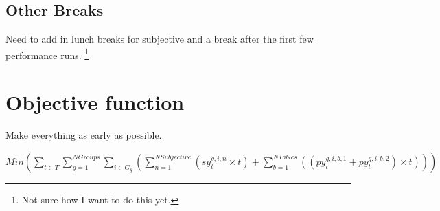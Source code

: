 \documentclass[letterpaper,11pt]{report}
\newcommand{\doccomment}[3]%
{\marginpar{\textcolor{#2}{\bf #1}}%
\footnote{{\color{#2}#3}}%
}
\newcommand{\doccomment}[3]{}
\newcommand{\jpscomment}[1]%
{\doccomment{SCHEWE}{Bittersweet}{#1}}
\begin{document}
\subsection{Other Breaks}
Need to add in lunch breaks for subjective and a break after the first few
performance runs. \jpscomment{Not sure how I want to do this yet.}

\section{Objective function}
Make everything as early as possible.

$Min ( 
\sum\limits_{t \in T}
 \sum\limits_{g=1}^{NGroups}
  \sum\limits_{i \in G_{g}} (
    \sum\limits_{n=1}^{NSubjective}
      ( sy_{t}^{g,i,n} \times t )
  + \sum\limits_{b=1}^{NTables} ( ( py_{t}^{g,i,b,1} + py_{t}^{g,i,b,2} )
  \times t)
  )
) $
\end{document}
